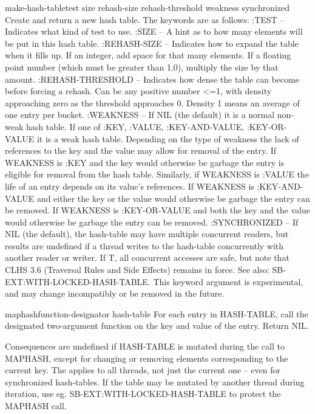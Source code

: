 \begin{function}{make-hash-table}{\key test size rehash-size rehash-threshold weakness synchronized}
  Create and return a new hash table. The keywords are as follows:
     :TEST -- Indicates what kind of test to use.
     :SIZE -- A hint as to how many elements will be put in this hash
       table.
     :REHASH-SIZE -- Indicates how to expand the table when it fills up.
       If an integer, add space for that many elements. If a floating
       point number (which must be greater than 1.0), multiply the size
       by that amount.
     :REHASH-THRESHOLD -- Indicates how dense the table can become before
       forcing a rehash. Can be any positive number <=1, with density
       approaching zero as the threshold approaches 0. Density 1 means an
       average of one entry per bucket.
     :WEAKNESS -- If NIL (the default) it is a normal non-weak hash table.
       If one of :KEY, :VALUE, :KEY-AND-VALUE, :KEY-OR-VALUE it is a weak
       hash table.
       Depending on the type of weakness the lack of references to the
       key and the value may allow for removal of the entry. If WEAKNESS
       is :KEY and the key would otherwise be garbage the entry is eligible
       for removal from the hash table. Similarly, if WEAKNESS is :VALUE
       the life of an entry depends on its value's references. If WEAKNESS
       is :KEY-AND-VALUE and either the key or the value would otherwise be
       garbage the entry can be removed. If WEAKNESS is :KEY-OR-VALUE and
       both the key and the value would otherwise be garbage the entry can
       be removed.
     :SYNCHRONIZED -- If NIL (the default), the hash-table may have
       multiple concurrent readers, but results are undefined if a
       thread writes to the hash-table concurrently with another
       reader or writer. If T, all concurrent accesses are safe, but
       note that CLHS 3.6 (Traversal Rules and Side Effects) remains
       in force. See also: SB-EXT:WITH-LOCKED-HASH-TABLE. This keyword
       argument is experimental, and may change incompatibly or be
       removed in the future.
\end{function}

\begin{function}{maphash}{function-designator hash-table}
  For each entry in HASH-TABLE, call the designated two-argument function on
the key and value of the entry. Return NIL.

Consequences are undefined if HASH-TABLE is mutated during the call to
MAPHASH, except for changing or removing elements corresponding to the
current key. The applies to all threads, not just the current one --
even for synchronized hash-tables. If the table may be mutated by
another thread during iteration, use eg. SB-EXT:WITH-LOCKED-HASH-TABLE
to protect the MAPHASH call.
\end{function}

